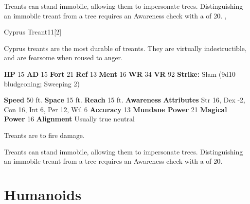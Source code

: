         Treants can stand immobile, allowing them to impersonate trees.
        Distinguishing an immobile treant from a tree requires an Awareness check with a  of 20.
  ,
  \begin{monsubsection}{Cyprus Treant}{11}[2]
    \vspace{-1em}\vspace{-1em}
    \vspace{0em}

    
        Cyprus treants are the most durable of treants.
        They are virtually indestructible, and are fearsome when roused to anger.
      
    

    \begin{spellcontent}
      \begin{spelltargetinginfo}
        \pari \textbf{HP} 15 \monsep
          \textbf{AD} 15 \monsep
          \textbf{Fort} 21 \monsep
          \textbf{Ref} 13 \monsep
          \textbf{Ment} 16
        \pari \textbf{WR} 34 \monsep
        \textbf{VR} 92
        \pari \textbf{Strike:}
            Slam  (9d10 bludgeoning; Sweeping 2)
      \end{spelltargetinginfo}
    \end{spellcontent}
    \begin{monsterfooter}
      \pari \textbf{Speed} 50 ft. \monsep
        \textbf{Space} 15 ft. \monsep
        \textbf{Reach} 15 ft.
      \pari \textbf{Awareness} 
      \pari \textbf{Attributes}
        Str 16, Dex -2,
        Con 16, Int 6,
        Per 12, Wil 6
      \pari \textbf{Accuracy} 13 \monsep
        \textbf{Mundane Power} 21 \monsep
      \textbf{Magical Power} 16
      \pari \textbf{Alignment} Usually true neutral
    \end{monsterfooter}
  \end{monsubsection}
        Treants are  to fire damage.
      
        Treants can stand immobile, allowing them to impersonate trees.
        Distinguishing an immobile treant from a tree requires an Awareness check with a  of 20.
  
  
        \section{Humanoids}

